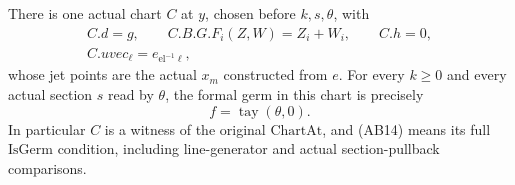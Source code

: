 \begin{srproposition}
\label{prop:ftb-actual-analytic-chart-taylor}
There is one actual chart \(C\) at \(y\), chosen before
\(k,s,\theta\), with
\[
 \begin{gathered}
 C.d=g,\qquad C.B.G.F_i(Z,W)=Z_i+W_i,\qquad C.h=0,\\
                       C.uvec_\ell=e_{\mathrm{el}^{-1}\ell},
 \end{gathered}                                           \tag{AB13}
\]
whose jet points are the actual \(x_m\) constructed from \(e\).
For every \(k\geq0\) and every actual section \(s\) read by
\(\theta\), the formal germ in this chart is precisely
\[
                              f=\operatorname{tay}(\theta,0).
                                                               \tag{AB14}
\]
In particular \(C\) is a witness of the original
\(\mathrm{ChartAt}\), and (AB14) means its full
\(\mathrm{IsGerm}\) condition, including line-generator
and actual section-pullback comparisons.
\end{srproposition}

